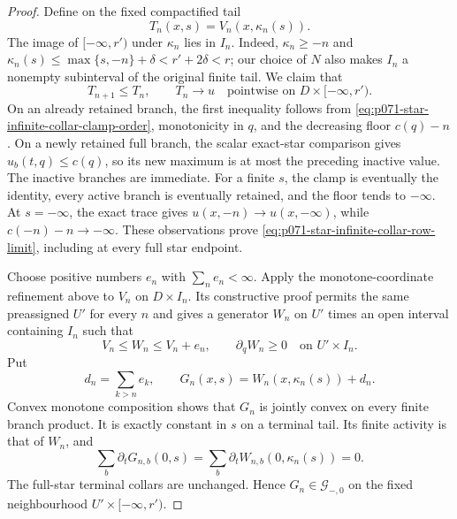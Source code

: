 \begin{proof}
Define on the fixed compactified tail
\begin{equation}
                        T_n(x,s)=V_n(x,\kappa_n(s)).
\label{eq:p071-star-infinite-collar-comparison-rows}
\end{equation}
The image of $[-\infty,r')$ under $\kappa_n$ lies in $I_n$.  Indeed,
$\kappa_n\geq-n$ and
$\kappa_n(s)\leq\max\{s,-n\}+\delta<r'+2\delta<r$; our choice of $N$
also makes $I_n$ a nonempty subinterval of the original finite tail.  We
claim
that
\begin{equation}
                         T_{n+1}\leq T_n,
 \qquad T_n\longrightarrow u
 \quad\text{pointwise on }D\times[-\infty,r').
\label{eq:p071-star-infinite-collar-row-limit}
\end{equation}
On an already retained branch, the first inequality follows from
\eqref{eq:p071-star-infinite-collar-clamp-order}, monotonicity in $q$,
and the decreasing floor $c(q)-n$.  On a newly retained full branch, the
scalar exact-star comparison gives $u_b(t,q)\leq c(q)$, so its new maximum
is at most the preceding inactive value.  The inactive branches are
immediate.  For a finite $s$, the clamp is eventually the identity, every
active branch is eventually retained, and the floor tends to $-\infty$.
At $s=-\infty$, the exact trace gives
$u(x,-n)\to u(x,-\infty)$, while
$c(-n)-n\to-\infty$.  These observations prove
\eqref{eq:p071-star-infinite-collar-row-limit}, including at every full
star endpoint.

Choose positive numbers $e_n$ with $\sum_ne_n<\infty$.  Apply the
monotone-coordinate refinement above to $V_n$ on $D\times I_n$.  Its
constructive proof permits the same preassigned $U'$ for every $n$ and
gives a generator $W_n$ on $U'$ times an open interval containing $I_n$
such that
\begin{equation}
 V_n\leq W_n\leq V_n+e_n,
 \qquad \partial_qW_n\geq0
 \quad\text{on }U'\times I_n.
\label{eq:p071-star-infinite-collar-uniform-smoothing}
\end{equation}
Put
\begin{equation}
 d_n=\sum_{k>n}e_k,
 \qquad
 G_n(x,s)=W_n(x,\kappa_n(s))+d_n.
\label{eq:p071-star-infinite-collar-final-approximants}
\end{equation}
Convex monotone composition shows that $G_n$ is jointly convex on every
finite branch product.  It is exactly constant in $s$ on a terminal tail.
Its finite activity is that of $W_n$, and
\[
 \sum_b\partial_tG_{n,b}(0,s)
   =\sum_b\partial_tW_{n,b}(0,\kappa_n(s))=0.
\]
The full-star terminal collars are unchanged.  Hence
$G_n\in\mathcal G_{-,0}$ on the fixed neighbourhood
$U'\times[-\infty,r')$.


\end{proof}
